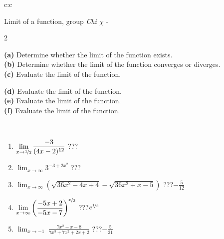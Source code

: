 \documentclass[10pt]{report}
\begin{document}
\newpage
\thispagestyle{empty}
\begin{tabular}{c:c}
\begin{minipage}[c][104.5mm][t]{0.5\linewidth}
\begin{center}
\vspace{5mm}
{\huge Limit of a function, group \textit{Chi $\chi$} -}\\[5mm]
\begin{minipage}{0.95\linewidth}
\begin{center}
{\small \begin{multicols}{2} \raggedright
\textbf{(a)} Determine whether the limit of the function exists. \\[1mm]
\textbf{(b)} Determine whether the limit of the function converges or diverges. \\[1mm]
\textbf{(c)} Evaluate the limit of the function. \par \columnbreak
\textbf{(d)} Evaluate the limit of the function. \\[1mm]
\textbf{(e)} Evaluate the limit of the function. \\[1mm]
\textbf{(f)} Evaluate the limit of the function. \\[1mm]
\end{multicols}
}
\end{center}
\end{minipage}
\\[1mm]
\begin{minipage}{0.79\linewidth}
\begin{center}
\begin{varwidth}{\linewidth}
\setlength{\itemsep}{0pt}
\begin{enumerate}
\normalsize
\item $\displaystyle\lim_{x\to\nicefrac{1}{2}}{\frac{-3}{(4x-2)^{12}}}$\quad \dotfill\; ???\;\dotfill \quad {}
\item $\displaystyle\lim_{x\to\infty}{3^{-3+2x^2}}$\quad \dotfill\; ???\;\dotfill \quad {}
\item $\displaystyle\lim_{x\to\infty}{\left(\sqrt{36x^2-4x+4} - \sqrt{36x^2+x-5}\right)}$\quad \dotfill\; ???\;\dotfill \quad $-\frac{5}{12}$
\item $\displaystyle\lim_{x\to\infty}{\left( \frac{-5x+2}{-5x-7} \right)^{\nicefrac{x}{3}}}$\quad \dotfill\; ???\;\dotfill \quad $e^{\nicefrac{1}{3}}$
\item $\displaystyle\lim_{x\to -1}{\;\frac{7x^2-x-8}{7x^3+7x^2+2x+2}}$\quad \dotfill\; ???\;\dotfill \quad $-\frac{5}{21}$

\end{enumerate}
\end{varwidth}
\end{center}
\end{minipage}
\end{center}
\end{minipage}
\end{tabular}
\end{document}
